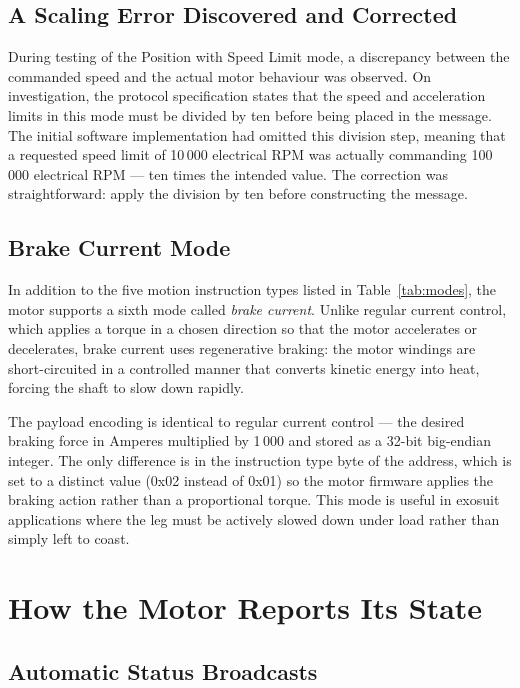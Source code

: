 \documentclass[12pt,a4paper]{article}
\begin{document}
\subsection{A Scaling Error Discovered and Corrected}

During testing of the Position with Speed Limit mode, a discrepancy between
the commanded speed and the actual motor behaviour was observed. On
investigation, the protocol specification states that the speed and
acceleration limits in this mode must be divided by ten before being placed
in the message. The initial software implementation had omitted this
division step, meaning that a requested speed limit of 10\,000 electrical
RPM was actually commanding 100\,000 electrical RPM --- ten times the
intended value. The correction was straightforward: apply the division by
ten before constructing the message.

\subsection{Brake Current Mode}

In addition to the five motion instruction types listed in
Table~\ref{tab:modes}, the motor supports a sixth mode called
\emph{brake current}.  Unlike regular current control, which applies a
torque in a chosen direction so that the motor accelerates or decelerates,
brake current uses regenerative braking: the motor windings are short-circuited
in a controlled manner that converts kinetic energy into heat, forcing the
shaft to slow down rapidly.

The payload encoding is identical to regular current control --- the desired
braking force in Amperes multiplied by 1\,000 and stored as a 32-bit
big-endian integer.  The only difference is in the instruction type byte of
the address, which is set to a distinct value (0x02 instead of 0x01) so
the motor firmware applies the braking action rather than a
proportional torque.  This mode is useful in exosuit applications where
the leg must be actively slowed down under load rather than simply left
to coast.

\section{How the Motor Reports Its State}
\label{sec:feedback}

\subsection{Automatic Status Broadcasts}
\end{document}
